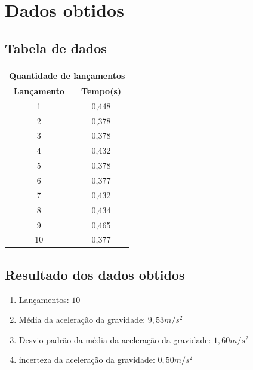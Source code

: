 \documentclass[a4paper]{article}
\begin{document}
\section{Dados obtidos}

\subsection{Tabela de dados}
\begin{center}
    \begin{tabular}{ |c|c| }
        \hline
        \multicolumn{2}{|c|}{Quantidade de lançamentos} \\

        \hline
        \textbf{Lançamento} & \textbf{Tempo(s)} \\ [0.5ex]
        \hline
        1 & 0,448 \\
        \hline
        2 & 0,378 \\
        \hline
        3 & 0,378 \\
        \hline
        4 & 0,432 \\
        \hline
        5 & 0,378 \\
        \hline
        6 & 0,377 \\
        \hline
        7 & 0,432 \\
        \hline
        8 & 0,434 \\
        \hline
        9 & 0,465 \\
        \hline
        10 & 0,377 \\
        \hline
    \end{tabular}
\end{center}

\subsection{Resultado dos dados obtidos}
\begin{enumerate}
    \item Lançamentos: $ 10 $
    \item Média da aceleração da gravidade: $ 9,53 m/s^2 $
    \item Desvio padrão da média da aceleração da gravidade: $ 1,60 m/s^2 $
    \item incerteza da aceleração da gravidade: $ 0,50 m/s^2 $
\end{enumerate}
\end{document}
